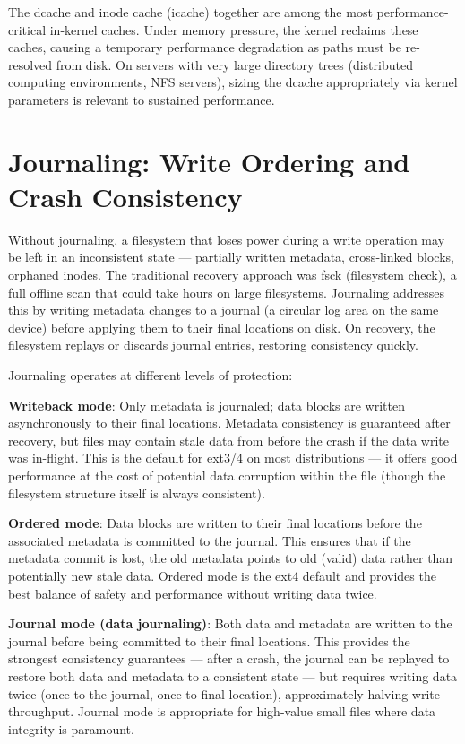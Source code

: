 The dcache and inode cache (icache) together are among the most performance-critical in-kernel caches. Under memory pressure, the kernel reclaims these caches, causing a temporary performance degradation as paths must be re-resolved from disk. On servers with very large directory trees (distributed computing environments, NFS servers), sizing the dcache appropriately via kernel parameters is relevant to sustained performance.

\section{Journaling: Write Ordering and Crash Consistency}
Without journaling, a filesystem that loses power during a write operation may be left in an inconsistent state --- partially written metadata, cross-linked blocks, orphaned inodes. The traditional recovery approach was fsck (filesystem check), a full offline scan that could take hours on large filesystems. Journaling addresses this by writing metadata changes to a journal (a circular log area on the same device) before applying them to their final locations on disk. On recovery, the filesystem replays or discards journal entries, restoring consistency quickly.

Journaling operates at different levels of protection:

\textbf{Writeback mode}: Only metadata is journaled; data blocks are written asynchronously to their final locations. Metadata consistency is guaranteed after recovery, but files may contain stale data from before the crash if the data write was in-flight. This is the default for ext3/4 on most distributions --- it offers good performance at the cost of potential data corruption within the file (though the filesystem structure itself is always consistent).

\textbf{Ordered mode}: Data blocks are written to their final locations before the associated metadata is committed to the journal. This ensures that if the metadata commit is lost, the old metadata points to old (valid) data rather than potentially new stale data. Ordered mode is the ext4 default and provides the best balance of safety and performance without writing data twice.

\textbf{Journal mode (data journaling)}: Both data and metadata are written to the journal before being committed to their final locations. This provides the strongest consistency guarantees --- after a crash, the journal can be replayed to restore both data and metadata to a consistent state --- but requires writing data twice (once to the journal, once to final location), approximately halving write throughput. Journal mode is appropriate for high-value small files where data integrity is paramount.

